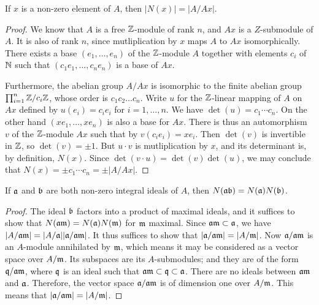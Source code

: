 \begin{prop}
  If $x$ is a non-zero element of $A$, then $|N(x)| = |A/Ax|$.
\end{prop}
\begin{proof}
  We know that $A$ is a free $\mathbb{Z}$-module of rank $n$, and $Ax$ is a $Z$-submodule of $A$. It is also of rank $n$, since mutliplication by $x$ maps $A$ to $Ax$ isomorphically. There exists a base $(e_1,\ldots, e_n)$ of the $\mathbb{Z}$-module $A$ together with elements $c_i$ of $\mathbb{N}$ such that $(c_1 e_1,\ldots, c_n e_n)$ is a base of $Ax$.

  Furthermore, the abelian group $A/Ax$ is isomorphic to the finite abelian group $\prod_{i=1}^n \mathbb{Z}/c_i\mathbb{Z}$, whose order is $c_1 c_2\ldots c_n$. Write $u$ for the $\mathbb{Z}$-linear mapping of $A$ on $Ax$ defined by $u(e_i)=c_i e_i$ for $i=1,\ldots, n$. We have $\det(u)=c_1\cdots c_n$. On the other hand $(xe_1,\ldots, xe_n)$ is also a base for $Ax$. There is thus an automorphism $v$ of the $\mathbb{Z}$-module $Ax$ such that by $v(c_i e_i)=xe_i$.
   Then $\det(v)$ is invertible in $\mathbb{Z}$, so $\det(v)=\pm 1$. But $u\cdot v$ is mutliplication by $x$, and its determinant is, by definition, $N(x)$. Since $\det(v\cdot u) = \det(v)\det(u)$, we may conclude that $N(x)=\pm c_1\cdots c_n = \pm |A/Ax|$.
\end{proof}


\begin{prop}
  If $\mathfrak{a}$ and $\mathfrak{b}$ are both non-zero integral ideals of $A$, then $N(\mathfrak{a}\mathfrak{b}) = N(\mathfrak{a})N(\mathfrak{b})$.
\end{prop}
\begin{proof}
  The ideal $\mathfrak{b}$ factors into a product of maximal ideals, and it suffices to show that $N(\mathfrak{a} \mathfrak{m})= N(\mathfrak{a})N(\mathfrak{m})$ for $\mathfrak{m}$ maximal. Since $\mathfrak{a}\mathfrak{m}\subset \mathfrak{a}$, we have $|A/\mathfrak{a}\mathfrak{m}| = |A/\mathfrak{a}| |\mathfrak{a}/\mathfrak{a}\mathfrak{m}|$. It thus suffices to show that $|\mathfrak{a}/\mathfrak{a}\mathfrak{m}| = |A/\mathfrak{m}|$. Now $\mathfrak{a}/\mathfrak{a}\mathfrak{m}$ is an $A$-module annihilated by $\mathfrak{m}$, which means it may be considered as a vector space over $A/\mathfrak{m}$.
  Its subspaces are its $A$-submodules; and they are of the form $\mathfrak{q}/\mathfrak{a}\mathfrak{m}$, where $\mathfrak{q}$ is an ideal such that $\mathfrak{a}\mathfrak{m} \subset \mathfrak{q} \subset \mathfrak{a}$. There are no ideals between $\mathfrak{a}\mathfrak{m}$ and $\mathfrak{a}$. Therefore, the vector space $\mathfrak{a}/\mathfrak{a}\mathfrak{m}$ is of dimension one over $A/\mathfrak{m}$. This means that $|\mathfrak{a}/\mathfrak{a}\mathfrak{m}| = |A/\mathfrak{m}|$.
 \end{proof}
